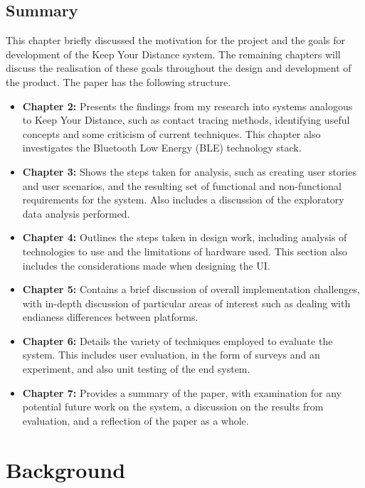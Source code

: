 \documentclass{l4proj}
\begin{document}
\section{Summary}
This chapter briefly discussed the motivation for the project and the goals for development of the Keep Your Distance system. The remaining chapters will discuss the realisation of these goals throughout the design and development of the product. The paper has the following structure.
\begin{itemize}
    \item \textbf{Chapter 2:} Presents the findings from my research into systems analogous to Keep Your Distance, such as contact tracing methods, identifying useful concepts and some criticism of current techniques. This chapter also investigates the Bluetooth Low Energy (BLE) technology stack.
    \item \textbf{Chapter 3:} Shows the steps taken for analysis, such as creating user stories and user scenarios, and the resulting set of functional and non-functional requirements for the system. Also includes a discussion of the exploratory data analysis performed.
    \item \textbf{Chapter 4:} Outlines the steps taken in design work, including analysis of technologies to use and the limitations of hardware used. This section also includes the considerations made when designing the UI.
    \item \textbf{Chapter 5:} Contains a brief discussion of overall implementation challenges, with in-depth discussion of particular areas of interest such as dealing with endianess differences between platforms.
    \item \textbf{Chapter 6:} Details the variety of techniques employed to evaluate the system. This includes user evaluation, in the form of surveys and an experiment, and also unit testing of the end system.
    \item \textbf{Chapter 7:} Provides a summary of the paper, with examination for any potential future work on the system, a discussion on the results from evaluation, and a reflection of the paper as a whole.
\end{itemize}



\chapter{Background}
\end{document}

